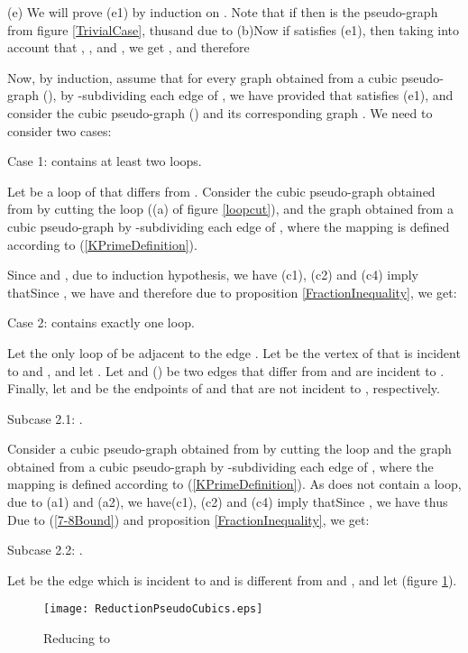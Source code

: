 \documentclass[fleqn,12pt,twoside]{article}
\newenvironment{proof}[1][Proof.]{\begin{trivlist}
\item[\hskip \labelsep {\bfseries #1}]}{\end{trivlist}}
\begin{document}
\begin{proof}
(e) We will prove (e1) by induction on . Note that if 
then  is the pseudo-graph from figure \ref{TrivialCase}, thusand due to (b)Now if  satisfies (e1), then taking into account that , ,  and , we get , and therefore


Now, by induction, assume that for every graph 
obtained from a cubic pseudo-graph  (),
by -subdividing each edge 
of , we have
provided that  satisfies (e1), and consider the
cubic pseudo-graph  () and its corresponding
graph . We need to consider two cases:

Case 1:  contains at least two loops.

Let  be a loop of  that differs from . Consider the
cubic pseudo-graph  obtained from  by
cutting the loop  ((a) of figure \ref{loopcut}), and the graph  obtained from a cubic pseudo-graph  by -subdividing each edge  of , where the mapping  is defined according to (\ref{KPrimeDefinition}).

Since  and , due to induction
hypothesis, we have
(c1), (c2) and (c4) imply thatSince ,  we have
and therefore due to proposition \ref{FractionInequality}, we get:


Case 2:  contains exactly one loop.

Let the only loop of  be adjacent to the edge . Let
 be the vertex of  that is incident to  and , and let . Let  and  () be
two edges that differ from  and are incident to . Finally,
let  and  be the endpoints of  and  that are
not incident to , respectively.

Subcase 2.1: .

Consider a cubic pseudo-graph  obtained from
 by cutting the loop  and the graph  obtained
from a cubic pseudo-graph  by -subdividing each edge  of
, where the mapping  is defined
according to (\ref{KPrimeDefinition}). As  does
not contain a loop, due to (a1) and (a2), we have(c1), (c2) and (c4) imply thatSince ,  we have
thus
Due to (\ref{7-8Bound}) and proposition \ref{FractionInequality}, we
get:


Subcase 2.2: .

Let  be the edge which is incident to  and is
different from  and , and let  (figure \ref{Reduction}).

\begin{figure}[h]
\begin{center}
\texttt{[image: ReductionPseudoCubics.eps]}\\
\caption{Reducing  to }\label{Reduction}
\end{center}
\end{figure}


\end{proof}
\end{document}
